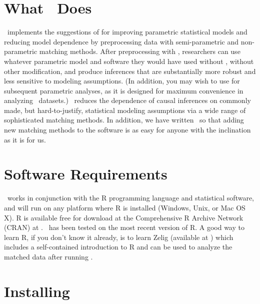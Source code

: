 
\section{What \MatchIt\ Does}

\MatchIt\ implements the suggestions of \citet*{HoImaKin05} for
improving parametric statistical models and reducing model dependence
by preprocessing data with semi-parametric and non-parametric matching
methods.  After preprocessing with \MatchIt, researchers can use
whatever parametric model and software they would have used without
\MatchIt, without other modification, and produce inferences that are
substantially more robust and less sensitive to modeling assumptions.
(In addition, you may wish to use
 \citep{ImaKinLau04} for
subsequent parametric analyses, as it is designed for maximum
convenience in analyzing \MatchIt\ datasets.)  \MatchIt\ reduces the
dependence of causal inferences on commonly made, but hard-to-justify,
statistical modeling assumptions via a wide range of sophisticated
matching methods.  In addition, we have written \MatchIt\ so that
adding new matching methods to the software is as easy for anyone with
the inclination as it is for us.

\section{Software Requirements} 
\label{sec:require}

\MatchIt\ works in conjunction with the R programming language and
statistical software, and will run on any platform where R is
installed (Windows, Unix, or Mac OS X).  R is available free for
download at the Comprehensive R Archive Network (CRAN) at
.
\MatchIt\ has been tested on the most recent version of R.  A good way
to learn R, if you don't know it already, is to learn Zelig (available
at ) which
includes a self-contained introduction to R and can be used to analyze
the matched data after running \MatchIt.

\section{Installing \MatchIt}
\label{sec:install}

